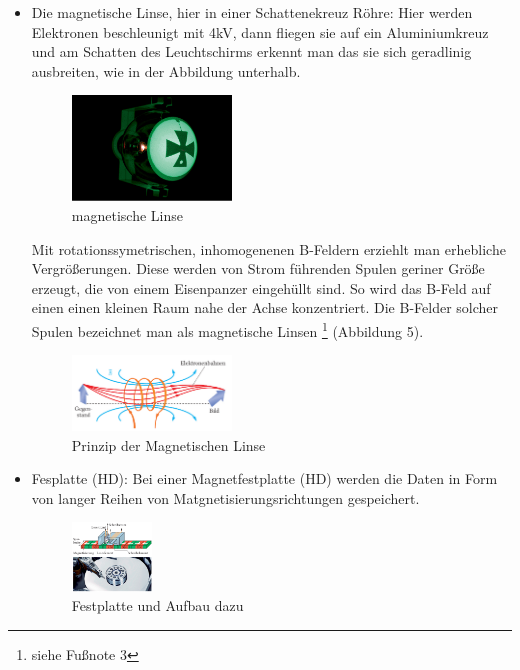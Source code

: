 \documentclass[a4paper]{report}
\begin{document}
\begin{itemize}
        \item Die magnetische Linse, hier in einer Schattenekreuz Röhre:
            Hier werden Elektronen beschleunigt mit  4kV, dann fliegen sie auf ein Aluminiumkreuz und am Schatten des Leuchtschirms erkennt man  das sie sich geradlinig ausbreiten, wie in der Abbildung unterhalb.
            \begin{figure}[htpb]
                \centering
                \includegraphics[width=0.4\textwidth]{Magnetische-Linsse.jpeg}
                \caption{magnetische Linse}
                \label{fig:magnetische-Linse}
            \end{figure}
            Mit rotationssymetrischen, inhomogenenen B-Feldern erziehlt man erhebliche Vergrößerungen. Diese werden von Strom führenden Spulen geriner Größe erzeugt, die von einem Eisenpanzer eingehüllt sind. So wird das B-Feld auf einen einen kleinen Raum nahe der Achse konzentriert. Die B-Felder solcher Spulen bezeichnet man als magnetische Linsen \footnote{siehe Fußnote 3} (Abbildung 5).
            \begin{figure}[htpb]
                \centering
                \includegraphics[width=0.4\textwidth]{Prinzip-linse.jpeg}
                \caption{Prinzip der Magnetischen Linse}
                \label{fig:Prinzip-der-Magnetischen-Linse}
            \end{figure}
        \item Fesplatte (HD):
            Bei einer Magnetfestplatte (HD) werden die Daten in Form von langer Reihen von Matgnetisierungsrichtungen gespeichert.
            \begin{figure}[htpb]
                \centering
                \includegraphics[width=0.2\textwidth]{Festplatte+magnet.jpeg}
                \caption{Festplatte und Aufbau dazu}
                \label{fig:}
            \end{figure}
    \end{itemize}
\end{document}
